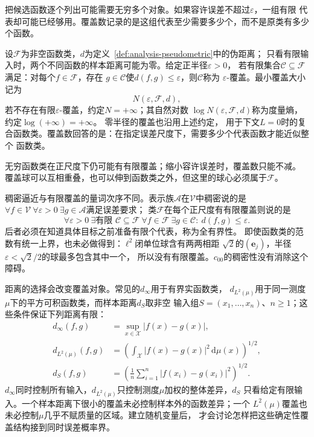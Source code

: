 把候选函数逐个列出可能需要无穷多个对象。如果容许误差不超过$\varepsilon$，一组有限
代表却可能已经够用。覆盖数记录的是这组代表至少需要多少个，而不是原类有多少个函数。
\begin{definition}[函数类的覆盖数与度量熵]
\label{def:functional-covering-number}
设$\mathcal F$为非空函数类，$d$为定义~\ref{def:analysis-pseudometric}中的伪距离；
只看有限输入时，两个不同函数的样本距离可能为零。给定正半径$\varepsilon>0$，
若有限集合$\mathcal{C}\subseteq\mathcal{F}$满足：对每个$f\in\mathcal{F}$，存在
$g\in\mathcal{C}$使$d(f,g)\leq\varepsilon$，则$\mathcal{C}$称为
$\varepsilon$-覆盖。最小覆盖大小记为
\[
  N(\varepsilon,\mathcal{F},d),
\]
若不存在有限$\varepsilon$-覆盖，约定$N=+\infty$；其自然对数
$\log N(\varepsilon,\mathcal F,d)$称为度量熵，约定$\log(+\infty)=+\infty$。
零半径的覆盖也沿用上述约定，
用于下文$L=0$时的复合函数类。覆盖数回答的是：在指定误差尺度下，需要多少个代表函数才能近似整个
函数类。
\end{definition}
无穷函数类在正尺度下仍可能有有限覆盖；缩小容许误差时，覆盖数只能不减。
覆盖球可以互相重叠，也可以伸到函数类之外，但这里的球心必须属于$\mathcal F$。

稠密逼近与有限覆盖的量词次序不同。表示族$\mathcal A$在$\mathcal V$中稠密说的是
$\forall f\in\mathcal V\ \forall\varepsilon>0\ \exists g\in\mathcal A$满足误差要求；
类$\mathcal F$在每个正尺度有有限覆盖则说的是
\[
 \forall\varepsilon>0\ \exists\text{有限 }\mathcal C\subseteq\mathcal F\
 \forall f\in\mathcal F\ \exists g\in\mathcal C:\ d(f,g)\leq\varepsilon.
\]
后者必须在知道具体目标之前准备有限个代表，称为全有界性。
即使函数类的范数有统一上界，也未必做得到：$\ell^2$闭单位球含有两两相距
$\sqrt2$的$(\bm e_j)$，半径$\varepsilon<\sqrt2/2$的球最多包含其中一个，
所以没有有限覆盖。$c_{00}$的稠密性没有消除这个障碍。

距离的选择会改变覆盖对象。常见的$d_\infty$用于有界实函数类，
$d_{L^2(\mu)}$用于同一测度$\mu$下的平方可积函数类，而样本距离$d_S$取非空
输入组$S=(x_1,\ldots,x_n)$、$n\geq1$；这些条件保证下列距离有限：
\begin{align*}
  d_{\infty}(f,g)
  &=
  \sup_{x\in\mathcal{X}}|f(x)-g(x)|,\\
  d_{L^2(\mu)}(f,g)
  &=
  \left(
    \int_{\mathcal{X}}|f(x)-g(x)|^2\,\mathrm{d}\mu(x)
  \right)^{1/2},\\
  d_S(f,g)
  &=
  \left(
    \frac1n\sum_{i=1}^{n}|f(x_i)-g(x_i)|^2
  \right)^{1/2}.
\end{align*}
$d_\infty$同时控制所有输入，$d_{L^2(\mu)}$只控制测度$\mu$加权的整体差异，$d_S$
只看给定有限输入。一个样本距离下很小的覆盖未必控制样本外的函数差异；一个
$L^2(\mu)$覆盖也未必控制$\mu$几乎不赋质量的区域。建立随机变量后，
才会讨论怎样把这些确定性覆盖结构接到同时误差概率界。

